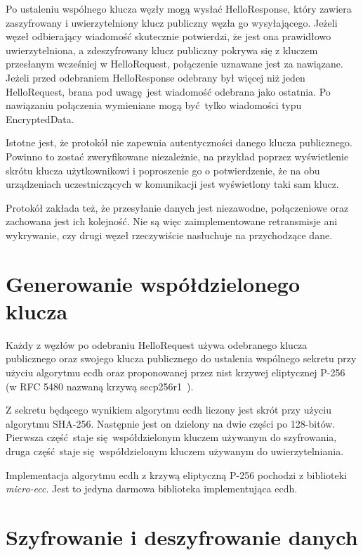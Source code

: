 Po ustaleniu wspólnego klucza węzły mogą wysłać HelloResponse, który zawiera zaszyfrowany i uwierzytelniony klucz publiczny węzła go wysyłającego. Jeżeli węzeł odbierający wiadomość skutecznie potwierdzi, że jest ona prawidłowo uwierzytelniona, a zdeszyfrowany klucz publiczny pokrywa się z kluczem przesłanym wcześniej w HelloRequest, połączenie uznawane jest za nawiązane. Jeżeli przed odebraniem HelloResponse odebrany był więcej niż jeden HelloRequest, brana pod uwagę jest wiadomość odebrana jako ostatnia. Po nawiązaniu połączenia wymieniane mogą być tylko wiadomości typu EncryptedData.

Istotne jest, że protokół nie zapewnia autentyczności danego klucza publicznego. Powinno to zostać zweryfikowane niezależnie, na przykład poprzez wyświetlenie skrótu klucza użytkownikowi i poproszenie go o potwierdzenie, że na obu urządzeniach uczestniczących w komunikacji jest wyświetlony taki sam klucz.

Protokół zakłada też, że przesyłanie danych jest niezawodne, połączeniowe oraz zachowana jest ich kolejność. Nie są więc zaimplementowane retransmisje ani wykrywanie, czy drugi węzeł rzeczywiście nasłuchuje na przychodzące dane.

\section{Generowanie współdzielonego klucza}
\label{sec:sharedkey}

Każdy z węzłów po odebraniu HelloRequest używa odebranego klucza publicznego oraz swojego klucza publicznego do ustalenia wspólnego sekretu przy użyciu algorytmu \gls{ecdh} oraz proponowanej przez \gls{nist} krzywej eliptycznej P-256~\cite{kerry2013digital} (w RFC 5480 nazwaną krzywą secp256r1~\cite{turner2009elliptic}).

Z sekretu będącego wynikiem algorytmu \gls{ecdh} liczony jest skrót przy użyciu algorytmu SHA-256. Następnie jest on dzielony na dwie części po 128-bitów. Pierwsza część staje się współdzielonym kluczem używanym do szyfrowania, druga część staje się współdzielonym kluczem używanym do uwierzytelniania.

Implementacja algorytmu \gls{ecdh} z krzywą eliptyczną P-256 pochodzi z biblioteki \emph{micro-ecc}. Jest to jedyna darmowa biblioteka implementująca \gls{ecdh}.

\section{Szyfrowanie i deszyfrowanie danych}
\label{sec:encrypt}

